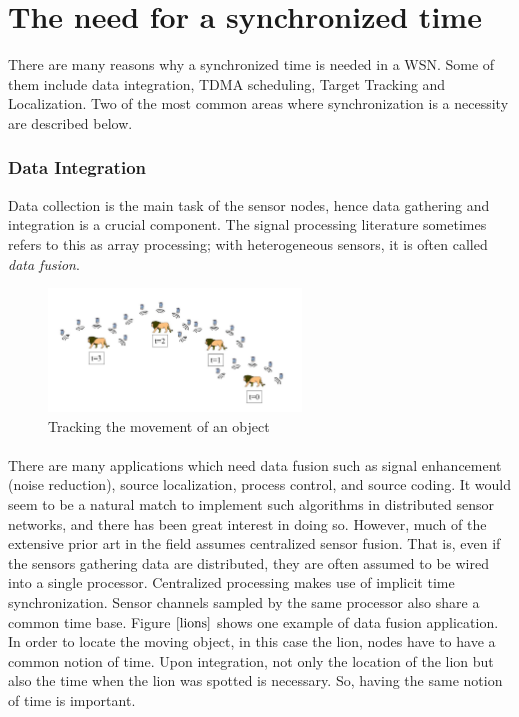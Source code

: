 \documentclass[a4paper,10pt]{report}
\begin{document}
\section{\textbf{The need for a synchronized time}}
There are many reasons why a synchronized time is needed in a WSN. Some of them include data integration, TDMA scheduling, Target
Tracking and Localization. Two of the most common areas where synchronization is a necessity are described below.
\subsubsection{Data Integration}
Data collection is the main task of the sensor nodes, hence data gathering and integration is a crucial component. The signal processing literature sometimes refers to this as array processing; with heterogeneous sensors, it is often called \textit{data fusion}.
\begin{figure}
\centering
\includegraphics[width= 0.6\textwidth]{lions}
\caption{Tracking the movement of an object}
\label{lions}
\end{figure}
\paragraph*{}
There are many applications which need data fusion such as signal
enhancement (noise reduction), source localization, process control,
and source coding. It would seem to be a natural match to implement
such algorithms in distributed sensor networks, and there has been
great interest in doing so. However, much of the extensive prior art
in the field assumes centralized sensor fusion. That is, even if the
sensors gathering data are distributed, they are often assumed to be
wired into a single processor. Centralized processing makes use of
implicit time synchronization. Sensor channels sampled by the same
processor also share a common time base. Figure $\ref{lions}$ shows
one example of data fusion application. In order to locate the
moving object, in this case the lion, nodes have to have a common
notion of time. Upon integration, not only the location of the lion
but also the time when the lion was spotted is necessary. So, having
the same notion of time is important.
\end{document}
